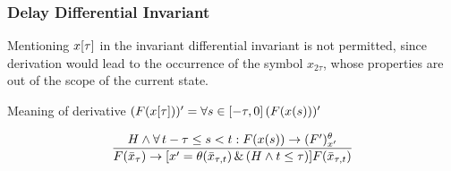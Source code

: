 \documentclass[10pt]{article}
\begin{document}
\begin{sidewaysfigure}
\begin{sequentdeduction}[]
{{{{{{{                                        }
                                    }{
                                    }
                                }{
                                }
                            }{
                            }
                        }{
                        }
                    }{
                    }
                }
                {}
            \end{sequentdeduction}
            \end{sidewaysfigure}
            \normalsize

        \subsubsection{Delay Differential Invariant}
            \label{sec:delay-differential-invariant}

            Mentioning $x[\tau]$ in the invariant differential invariant is not permitted, since derivation would lead to the occurrence of the symbol $x_{2\tau}$, whose properties are out of the scope of the current state.

            Meaning of derivative $(F(x[\tau]))'=\forall s\in[-\tau,0]{\,} (F(x(s)))'$

            \begin{equation}
                \frac{H\wedge\forall\,t-\tau\leq s<t: F(x(s))\rightarrow (F')^{\theta}_{x'}}{F(\bar{x}_{\tau})\rightarrow [x'=\theta(\bar{x}_{\tau,t})\,\&\,(H\wedge t\leq\tau)]F(\bar{x}_{\tau,t})}
            \end{equation}
\end{document}
